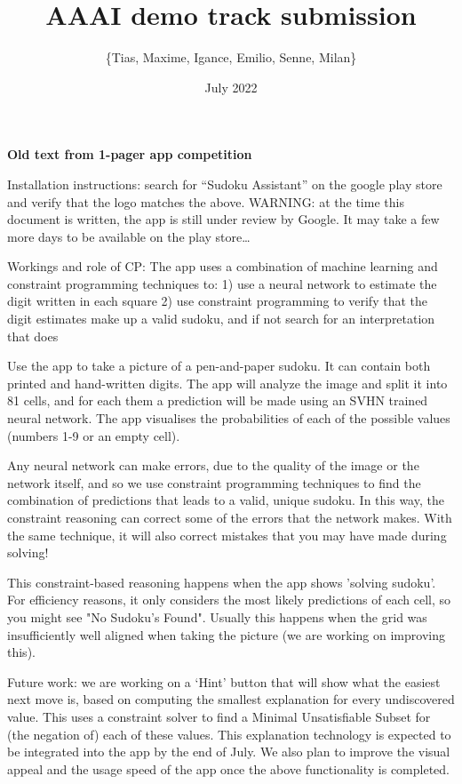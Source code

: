 \documentclass{article}
\title{AAAI demo track submission}
\author{\{Tias, Maxime, Igance, Emilio, Senne, Milan\}}
\date{July 2022}
\begin{document}
\maketitle

\textbf{Old text from 1-pager app competition}

Installation instructions: search for “Sudoku Assistant” on the google play store and verify that the logo matches the above.
	WARNING: at the time this document is written, the app is still under review by Google. It may take a few more days to be available on the play store…

Workings and role of CP:
The app uses a combination of machine learning and constraint programming techniques to:
1) use a neural network to estimate the digit written in each square
2) use constraint programming to verify that the digit estimates make up a valid sudoku, and if not search for an interpretation that does

Use the app to take a picture of a pen-and-paper sudoku. It can contain both printed and hand-written digits. The app will analyze the image and split it into 81 cells, and for each them a prediction will be made using an SVHN trained neural network. The app visualises the probabilities of each of the possible values (numbers 1-9 or an empty cell).

Any neural network can make errors, due to the quality of the image or the network itself, and so we use constraint programming techniques to find the combination of predictions that leads to a valid, unique sudoku. In this way, the constraint reasoning can correct some of the errors that the network makes. With the same technique, it will also correct mistakes that you may have made during solving!

This constraint-based reasoning happens when the app shows 'solving sudoku'. For efficiency reasons, it only considers the most likely predictions of each cell, so you might see "No Sudoku's Found". Usually this happens when the grid was insufficiently well aligned when taking the picture (we are working on improving this).

Future work: we are working on a ‘Hint’ button that will show what the easiest next move is, based on computing the smallest explanation for every undiscovered value. This uses a constraint solver to find a Minimal Unsatisfiable Subset for (the negation of) each of these values. This explanation technology is expected to be integrated into the app by the end of July.
We also plan to improve the visual appeal and the usage speed of the app once the above functionality is completed.
\end{document}
